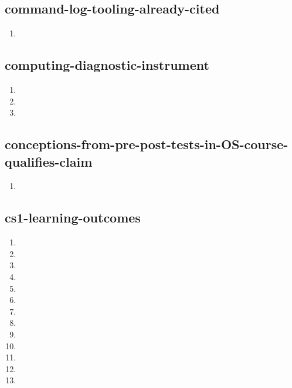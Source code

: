 \documentclass{article}
\begin{document}
\subsection{command-log-tooling-already-cited}
\begin{enumerate}
\item {}
\end{enumerate}

\subsection{computing-diagnostic-instrument}
\begin{enumerate}
\item {}
\item {}
\item {}
\end{enumerate}

\subsection{conceptions-from-pre-post-tests-in-OS-course-qualifies-claim}
\begin{enumerate}
\item {}
\end{enumerate}

\subsection{cs1-learning-outcomes}
\begin{enumerate}
\item {}
\item {}
\item {}
\item {}
\item {}
\item {}
\item {}
\item {}
\item {}
\item {}
\item {}
\item {}
\item {}
\end{enumerate}
\end{document}
